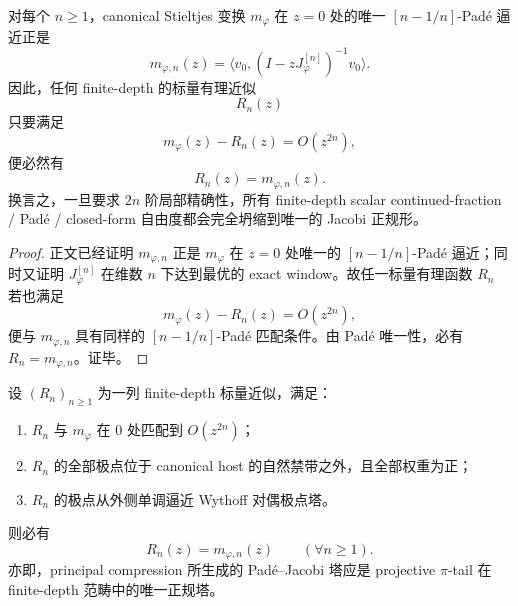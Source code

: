 \begin{theorem}\label{thm:conclusion-oddtail-finite-depth-scalar-pade-jacobi-rigidity}
对每个 \(n\ge 1\)，canonical Stieltjes 变换 \(m_\varphi\) 在 \(z=0\) 处的唯一 \([n-1/n]\)-Pad\'e 逼近正是
\[
m_{\varphi,n}(z)
=
\langle v_0,(I-zJ_\varphi^{[n]})^{-1}v_0\rangle.
\]
因此，任何 finite-depth 的标量有理近似
\[
R_n(z)
\]
只要满足
\[
m_\varphi(z)-R_n(z)=O(z^{2n}),
\]
便必然有
\[
R_n(z)=m_{\varphi,n}(z).
\]
换言之，一旦要求 \(2n\) 阶局部精确性，所有 finite-depth scalar continued-fraction / Pad\'e / closed-form 自由度都会完全坍缩到唯一的 Jacobi 正规形。
\end{theorem}
\begin{proof}
正文已经证明 \(m_{\varphi,n}\) 正是 \(m_\varphi\) 在 \(z=0\) 处唯一的 \([n-1/n]\)-Pad\'e 逼近；同时又证明 \(J_\varphi^{[n]}\) 在维数 \(n\) 下达到最优的 exact window。故任一标量有理函数 \(R_n\) 若也满足
\[
m_\varphi(z)-R_n(z)=O(z^{2n}),
\]
便与 \(m_{\varphi,n}\) 具有同样的 \([n-1/n]\)-Pad\'e 匹配条件。由 Pad\'e 唯一性，必有 \(R_n=m_{\varphi,n}\)。证毕。
\end{proof}

\begin{conjecture}\label{conj:conclusion-oddtail-unique-finite-depth-normal-tower}
设 \((R_n)_{n\ge 1}\) 为一列 finite-depth 标量近似，满足：
\begin{enumerate}
  \item \(R_n\) 与 \(m_\varphi\) 在 \(0\) 处匹配到 \(O(z^{2n})\)；
  \item \(R_n\) 的全部极点位于 canonical host 的自然禁带之外，且全部权重为正；
  \item \(R_n\) 的极点从外侧单调逼近 Wythoff 对偶极点塔。
\end{enumerate}
则必有
\[
R_n(z)=m_{\varphi,n}(z)
\qquad (\forall n\ge 1).
\]
亦即，principal compression 所生成的 Pad\'e--Jacobi 塔应是 projective \(\pi\)-tail 在 finite-depth 范畴中的唯一正规塔。
\end{conjecture}

